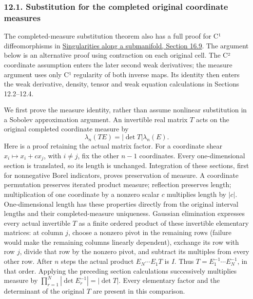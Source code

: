 \documentclass[
  11pt,
]{article}
\begin{document}
\subsubsection{12.1. Substitution for the completed original coordinate
measures}\label{substitution-for-the-completed-original-coordinate-measures}

The completed-measure substitution theorem also has a full proof for C¹
diffeomorphisms in
\href{conormal-transmission.pdf}{Singularities along
a submanifold, Section 16.9}. The argument below is an alternative proof
using contraction on each original cell. The C² coordinate assumption
enters the later second weak derivatives; the measure argument uses only
C¹ regularity of both inverse maps. Its identity then enters the weak
derivative, density, tensor and weak equation calculations in Sections
12.2--12.4.

We first prove the measure identity, rather than assume nonlinear
substitution in a Sobolev approximation argument. An invertible real
matrix \(T\) acts on the original completed coordinate measure by \[
             \lambda_n(TE)=|\det T|\lambda_n(E).                 \tag{CX3}
\] Here is a proof retaining the actual matrix factor. For a coordinate
shear \(x_i\mapsto x_i+c x_j\), with \(i\ne j\), fix the other \(n-1\)
coordinates. Every one-dimensional section is translated, so its length
is unchanged. Integration of these sections, first for nonnegative Borel
indicators, proves preservation of measure. A coordinate permutation
preserves iterated product measure; reflection preserves length;
multiplication of one coordinate by a nonzero scalar \(c\) multiplies
length by \(|c|\). One-dimensional length has these properties directly
from the original interval lengths and their completed-measure
uniqueness. Gaussian elimination expresses every actual invertible \(T\)
as a finite ordered product of these invertible elementary matrices: at
column \(j\), choose a nonzero pivot in the remaining rows (failure
would make the remaining columns linearly dependent), exchange its row
with row \(j\), divide that row by the nonzero pivot, and subtract its
multiples from every other row. After \(n\) steps the actual product
\(E_N\cdots E_1T\) is \(I\). Thus \(T=E_1^{-1}\cdots E_N^{-1}\), in that
order. Applying the preceding section calculations successively
multiplies measure by \(\prod_{r=1}^N|\det E_r^{-1}|=|\det T|\). Every
elementary factor and the determinant of the original \(T\) are present
in this comparison.
\end{document}

